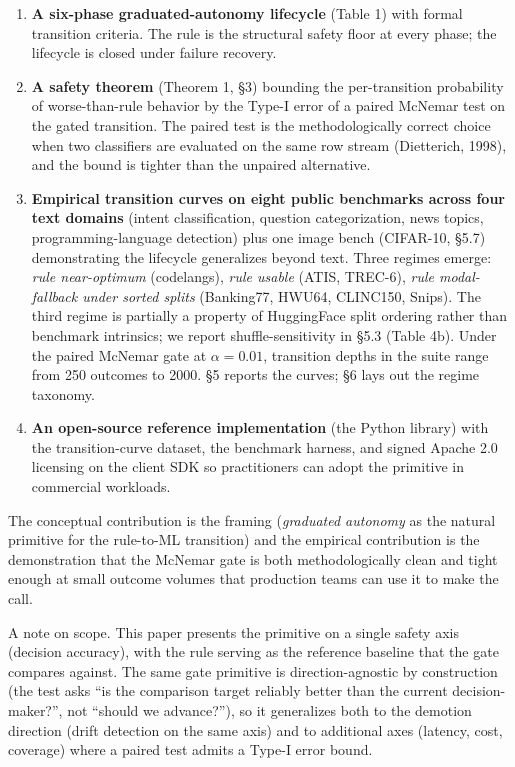 \begin{enumerate}
\def\labelenumi{\arabic{enumi}.}
\item
  \textbf{A six-phase graduated-autonomy lifecycle} (Table 1) with
  formal transition criteria. The rule is the structural safety floor at
  every phase; the lifecycle is closed under failure recovery.
\item
  \textbf{A safety theorem} (Theorem 1, §3) bounding the per-transition
  probability of worse-than-rule behavior by the Type-I error of a
  paired McNemar test on the gated transition. The paired test is the
  methodologically correct choice when two classifiers are evaluated on
  the same row stream (Dietterich, 1998), and the bound is tighter than
  the unpaired alternative.
\item
  \textbf{Empirical transition curves on eight public benchmarks across
  four text domains} (intent classification, question categorization,
  news topics, programming-language detection) plus one image bench
  (CIFAR-10, §5.7) demonstrating the lifecycle generalizes beyond text.
  Three regimes emerge: \emph{rule near-optimum} (codelangs), \emph{rule
  usable} (ATIS, TREC-6), \emph{rule modal-fallback under sorted splits}
  (Banking77, HWU64, CLINC150, Snips). The third regime is partially a
  property of HuggingFace split ordering rather than benchmark
  intrinsics; we report shuffle-sensitivity in §5.3 (Table 4b). Under
  the paired McNemar gate at \(\alpha = 0.01\), transition depths in the
  suite range from 250 outcomes to 2000. §5 reports the curves; §6 lays
  out the regime taxonomy.
\item
  \textbf{An open-source reference implementation} (the \sysname{} Python
  library) with the transition-curve dataset, the benchmark harness, and
  signed Apache 2.0 licensing on the client SDK so practitioners can
  adopt the primitive in commercial workloads.
\end{enumerate}

The conceptual contribution is the framing (\emph{graduated autonomy} as
the natural primitive for the rule-to-ML transition) and the empirical
contribution is the demonstration that the McNemar gate is both
methodologically clean and tight enough at small outcome volumes that
production teams can use it to make the call.

A note on scope. This paper presents the primitive on a single safety
axis (decision accuracy), with the rule serving as the reference
baseline that the gate compares against. The same gate primitive is
direction-agnostic by construction (the test asks ``is the comparison
target reliably better than the current decision-maker?'', not ``should
we advance?''), so it generalizes both to the demotion direction (drift
detection on the same axis) and to additional axes (latency, cost,
coverage) where a paired test admits a Type-I error bound.

